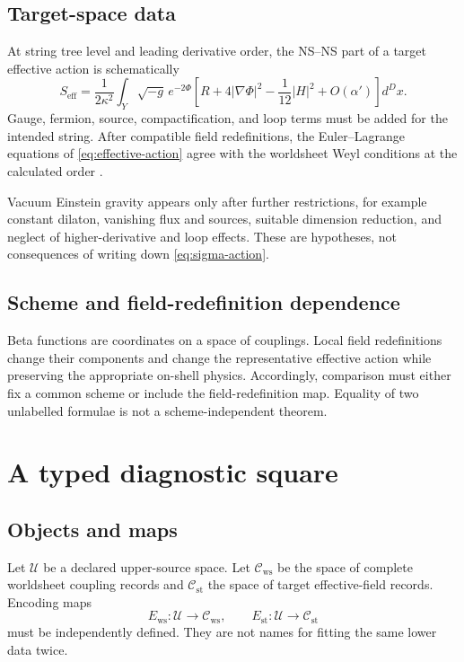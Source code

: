 \documentclass[11pt]{article}
\newcommand{\cC}{\mathcal{C}}
\newcommand{\cU}{\mathcal{U}}
\newcommand{\alphap}{\alpha'}
\begin{document}
\subsection{Target-space data}

At string tree level and leading derivative order, the NS--NS part of a
target effective action is schematically
\begin{equation}
S_{\mathrm{eff}}
=\frac{1}{2\kappa^2}\int_Y
\sqrt{-g}\,e^{-2\Phi}
\left[
R+4|\nabla\Phi|^2-\frac1{12}|H|^2+O(\alphap)
\right]d^Dx .
\label{eq:effective-action}
\end{equation}
Gauge, fermion, source, compactification, and loop terms must be added for
the intended string.  After compatible field redefinitions, the
Euler--Lagrange equations of \eqref{eq:effective-action} agree with the
worldsheet Weyl conditions at the calculated order
\cite{CallanEtAl1985,MetsaevTseytlin1987,HullTownsend1986}.

Vacuum Einstein gravity appears only after further restrictions, for example
constant dilaton, vanishing flux and sources, suitable dimension reduction,
and neglect of higher-derivative and loop effects.  These are hypotheses, not
consequences of writing down \eqref{eq:sigma-action}.

\subsection{Scheme and field-redefinition dependence}

Beta functions are coordinates on a space of couplings.  Local field
redefinitions change their components and change the representative
effective action while preserving the appropriate on-shell physics.
Accordingly, comparison must either fix a common scheme or include the
field-redefinition map.  Equality of two unlabelled formulae is not a
scheme-independent theorem.

\section{A typed diagnostic square}

\subsection{Objects and maps}

Let \(\cU\) be a declared upper-source space.  Let
\(\cC_{\mathrm{ws}}\) be the space of complete worldsheet coupling records
and \(\cC_{\mathrm{st}}\) the space of target effective-field records.
Encoding maps
\[
E_{\mathrm{ws}}:\cU\to\cC_{\mathrm{ws}},
\qquad
E_{\mathrm{st}}:\cU\to\cC_{\mathrm{st}}
\]
must be independently defined.  They are not names for fitting the same
lower data twice.
\end{document}
